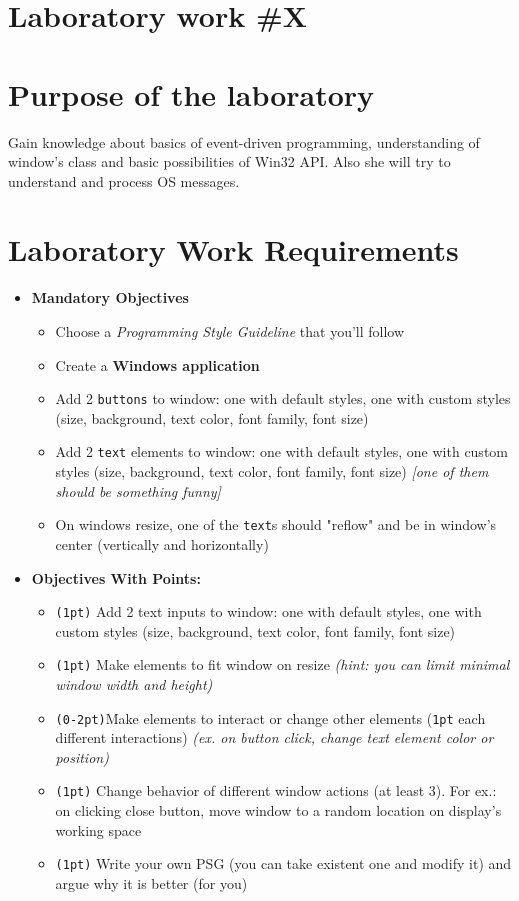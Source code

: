 \section*{Laboratory work \#X}

\section{Purpose of the laboratory}
Gain knowledge about basics of event-driven programming, understanding of window’s class and basic possibilities of Win32 API. Also she will try to understand and process OS messages.
\section{Laboratory Work Requirements}
\begin{itemize}
	\item \textbf{Mandatory Objectives}
	      \begin{itemize}
		      \item Choose a \textit{Programming Style Guideline} that you'll follow
		      \item Create a \textbf{Windows application}
		      \item Add 2 \texttt{buttons} to window: one with default styles, one with custom styles (size, background, text color, font family, font size)
		      \item Add 2 \texttt{text} elements to window: one with default styles, one with custom styles (size, background, text color, font family, font size) \textit{[one of them should be something funny]}
		      \item On windows resize, one of the \texttt{text}s should "reflow" and be in window's center (vertically and horizontally)
	      \end{itemize}
	\item \textbf{Objectives With Points:}
	      \begin{itemize}
		      \item \texttt{(1pt)} Add 2 text inputs to window: one with default styles, one with custom styles (size, background, text color, font family, font size)
		      \item \texttt{(1pt)} Make elements to fit window on resize \textit{(hint: you can limit minimal window width and height)}
		      \item \texttt{(0-2pt)}Make elements to interact or change other elements (\texttt{1pt} each different interactions) \textit{(ex. on button click, change text element color or position)}
		      \item \texttt{(1pt)} Change behavior of different window actions (at least 3). For ex.: on clicking close button, move window to a random location on display's working space
		      \item \texttt{(1pt)} Write your own PSG (you can take existent one and modify it) and argue why it is better (for you)
	      \end{itemize}
\end{itemize}

\clearpage